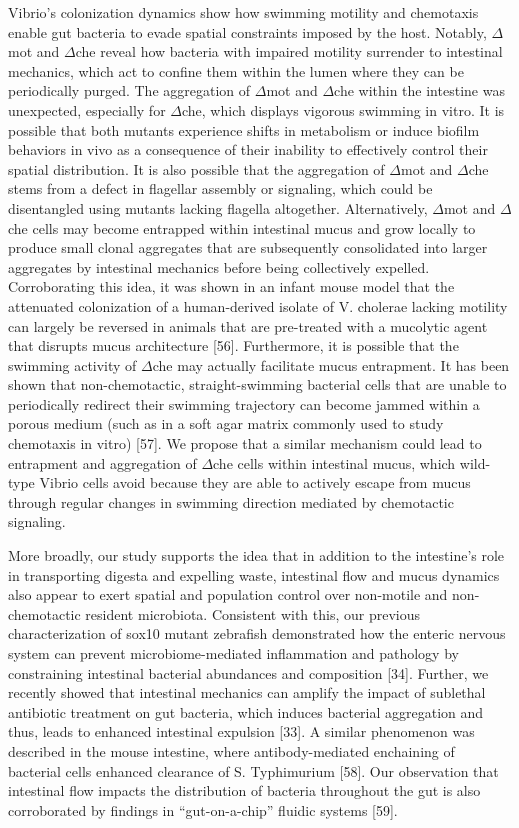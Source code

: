 Vibrio's colonization dynamics show how swimming motility and chemotaxis enable gut bacteria to evade spatial constraints imposed by the host. Notably, $\Delta$mot and $\Delta$che reveal how bacteria with impaired motility surrender to intestinal mechanics, which act to confine them within the lumen where they can be periodically purged. The aggregation of $\Delta$mot and $\Delta$che within the intestine was unexpected, especially for $\Delta$che, which displays vigorous swimming in vitro. It is possible that both mutants experience shifts in metabolism or induce biofilm behaviors in vivo as a consequence of their inability to effectively control their spatial distribution. It is also possible that the aggregation of $\Delta$mot and $\Delta$che stems from a defect in flagellar assembly or signaling, which could be disentangled using mutants lacking flagella altogether. Alternatively, $\Delta$mot and $\Delta$che cells may become entrapped within intestinal mucus and grow locally to produce small clonal aggregates that are subsequently consolidated into larger aggregates by intestinal mechanics before being collectively expelled. Corroborating this idea, it was shown in an infant mouse model that the attenuated colonization of a human-derived isolate of V. cholerae lacking motility can largely be reversed in animals that are pre-treated with a mucolytic agent that disrupts mucus architecture [56]. Furthermore, it is possible that the swimming activity of $\Delta$che may actually facilitate mucus entrapment. It has been shown that non-chemotactic, straight-swimming bacterial cells that are unable to periodically redirect their swimming trajectory can become jammed within a porous medium (such as in a soft agar matrix commonly used to study chemotaxis in vitro) [57]. We propose that a similar mechanism could lead to entrapment and aggregation of $\Delta$che cells within intestinal mucus, which wild-type Vibrio cells avoid because they are able to actively escape from mucus through regular changes in swimming direction mediated by chemotactic signaling.

More broadly, our study supports the idea that in addition to the intestine's role in transporting digesta and expelling waste, intestinal flow and mucus dynamics also appear to exert spatial and population control over non-motile and non-chemotactic resident microbiota. Consistent with this, our previous characterization of sox10 mutant zebrafish demonstrated how the enteric nervous system can prevent microbiome-mediated inflammation and pathology by constraining intestinal bacterial abundances and composition [34]. Further, we recently showed that intestinal mechanics can amplify the impact of sublethal antibiotic treatment on gut bacteria, which induces bacterial aggregation and thus, leads to enhanced intestinal expulsion [33]. A similar phenomenon was described in the mouse intestine, where antibody-mediated enchaining of bacterial cells enhanced clearance of S. Typhimurium [58]. Our observation that intestinal flow impacts the distribution of bacteria throughout the gut is also corroborated by findings in ``gut-on-a-chip'' fluidic systems [59]. 

